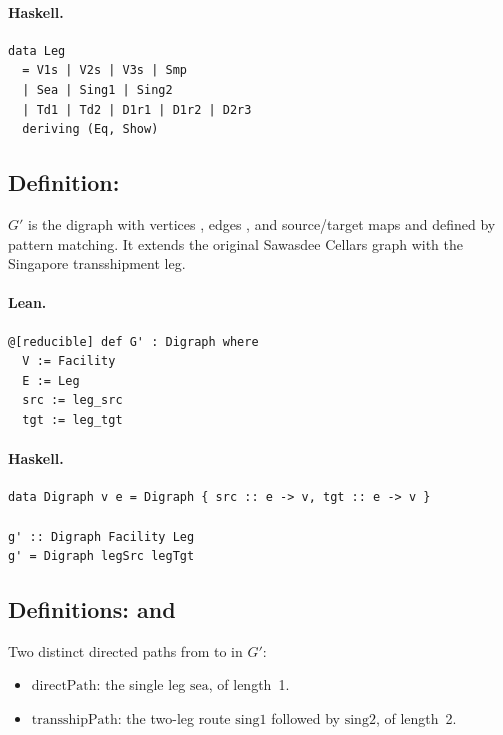 \documentclass[11pt,a4paper]{article}
\begin{document}
\paragraph{Haskell.}
\begin{lstlisting}[style=haskell]
data Leg
  = V1s | V2s | V3s | Smp
  | Sea | Sing1 | Sing2
  | Td1 | Td2 | D1r1 | D1r2 | D2r3
  deriving (Eq, Show)
\end{lstlisting}


\subsection{Definition: }

\begin{defn}
$G'$ is the digraph with vertices , edges , and
source/target maps  and  defined by pattern
matching.  It extends the original Sawasdee Cellars graph with the Singapore
transshipment leg.
\end{defn}

\paragraph{Lean.}
\begin{lstlisting}[style=lean]
@[reducible] def G' : Digraph where
  V := Facility
  E := Leg
  src := leg_src
  tgt := leg_tgt
\end{lstlisting}

\paragraph{Haskell.}
\begin{lstlisting}[style=haskell]
data Digraph v e = Digraph { src :: e -> v, tgt :: e -> v }

g' :: Digraph Facility Leg
g' = Digraph legSrc legTgt
\end{lstlisting}


\subsection{Definitions:  and }

\begin{defn}
Two distinct directed paths from  to  in
$G'$:
\begin{itemize}
  \item $\text{directPath}$: the single leg $\mathrm{sea}$, of length~1.
  \item $\text{transshipPath}$: the two-leg route $\mathrm{sing1}$ followed by
    $\mathrm{sing2}$, of length~2.
\end{itemize}
\end{defn}
\end{document}
